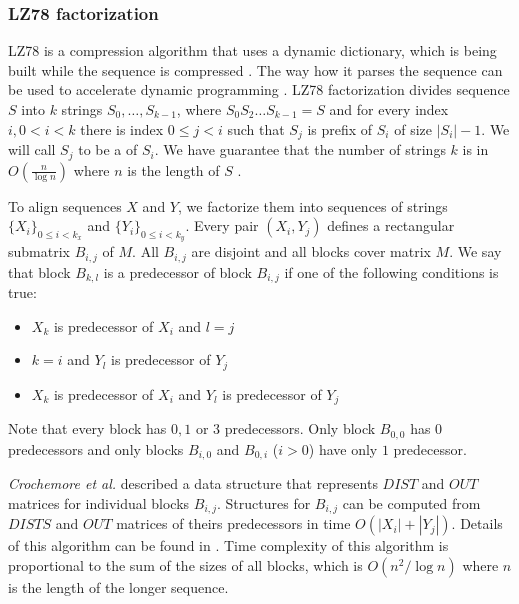 \subsubsection{LZ78 factorization}

LZ78 is a compression algorithm that uses a dynamic dictionary, which is being built
while the sequence is compressed \cite{Lempel1976}. The way how it parses the sequence
can be used to accelerate dynamic programming \cite{Crochemore2002,Weimann2009}. 
LZ78 factorization divides
sequence $S$ into $k$ strings $S_0,\dots,S_{k-1}$, where $S_0S_2\dots S_{k-1}=S$ and
for every index  $i,0< i <k$ there is index $0\leq j<i$ such that $S_j$ is
prefix of $S_i$ of size $|S_i|-1$. We will call $S_j$ to be a
 of $S_i$.  We have guarantee that the number of strings
$k$ is in  $O(\frac{n}{\log n})$ where $n$ is the length of $S$
\cite{Lempel1976}. 

To align sequences $X$ and $Y$, we factorize them into sequences of strings
$\{X_i\}_{0\leq i < k_x}$ and $\{Y_i\}_{0\leq i<k_y}$.  Every pair $(X_i,Y_j)$
defines a rectangular submatrix $B_{i,j}$ of $M$.  All $B_{i,j}$ are
disjoint and all blocks cover matrix $M$. We say that block $B_{k,l}$ is
a predecessor of block $B_{i,j}$ if one of the following conditions is true:


\begin{itemize}
\item $X_k$ is predecessor of $X_i$ and $l=j$
\item $k=i$ and $Y_l$ is predecessor of $Y_j$
\item $X_k$ is predecessor of $X_i$ and $Y_l$ is predecessor of $Y_j$
\end{itemize}

Note that every block has $0,1$ or $3$ predecessors. Only block
$B_{0,0}$ has $0$ predecessors and only blocks $B_{i,0}$ and $B_{0,i}$
($i>0$) have only $1$ predecessor.  

{\it Crochemore et al.} described a data structure that represents $DIST$ and $OUT$
matrices for  \nocite{Crochemore2002} individual blocks $B_{i,j}$. Structures
for $B_{i,j}$ can be
computed from $DISTS$ and $OUT$ matrices of theirs predecessors in time
$O(|X_i|+|Y_j|)$. Details of this algorithm can be found in
\cite{Crochemore2002}. Time complexity of this algorithm is proportional to the
sum of the sizes of all blocks, which is $O(n^2/\log n)$ where $n$ is the length
of the longer sequence.




